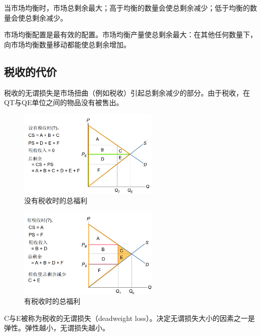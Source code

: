 \documentclass[12pt, a4paper]{article}
\begin{document}
当市场均衡时，市场总剩余最大；高于均衡的数量会使总剩余减少；低于均衡的数量会使总剩余减少。

市场均衡配置是最有效的配置。市场均衡产量使总剩余最大：在其他任何数量下，向市场均衡数量移动都能使总剩余增加。

\subsection{税收的代价}
税收的无谓损失是市场扭曲（例如税收）引起总剩余减少的部分。由于税收，在QT与QE单位之间的物品没有被售出。

\begin{figure}[H]
  \centering
  \includegraphics[width=0.6\textwidth]{没有税收时的总福利.png}
  \caption{没有税收时的总福利}
\end{figure}

\begin{figure}[H]
  \centering
  \includegraphics[width=0.6\textwidth]{有税收时的总福利.png}
  \caption{有税收时的总福利}
\end{figure}

C与E被称为税收的无谓损失（deadweight loss）。决定无谓损失大小的因素之一是弹性。弹性越小，无谓损失越小。
\end{document}
